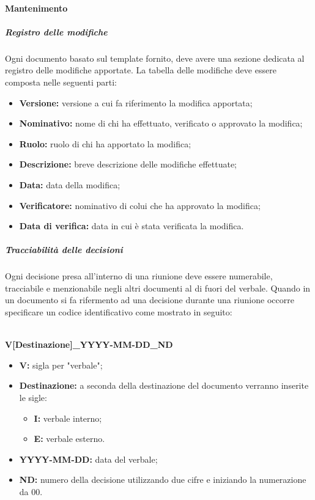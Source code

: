   \paragraph{Mantenimento}
	  \subparagraph*{Registro delle modifiche}
	  Ogni documento basato sul template fornito, deve avere una sezione dedicata al registro delle modifiche apportate.
	  La tabella delle modifiche deve essere composta nelle seguenti parti:
	  \begin{itemize}
	  	\item \textbf{Versione:} versione a cui fa riferimento la modifica apportata;
	  	\item \textbf{Nominativo:} nome di chi ha effettuato, verificato o approvato la modifica;
	  	\item \textbf{Ruolo:} ruolo di chi ha apportato la modifica;
	  	\item \textbf{Descrizione:} breve descrizione delle modifiche effettuate;
	  	\item \textbf{Data:} data della modifica;
	  	\item \textbf{Verificatore:} nominativo di colui che ha approvato la modifica;
	  	\item \textbf{Data di verifica:} data in cui è stata verificata la modifica.
	  \end{itemize}

    \subparagraph*{Tracciabilità delle decisioni}
      Ogni decisione presa all'interno di una riunione deve essere numerabile, tracciabile e menzionabile negli altri documenti al di fuori del verbale. Quando in un documento si fa rifermento ad una decisione durante una riunione
      occorre specificare un codice identificativo come mostrato in seguito:\\\\
      \centerline{\textbf{V[Destinazione]\_YYYY-MM-DD\_ND}}
      \begin{itemize}
      	\item \textbf{V:} sigla per "verbale";
      	\item \textbf{Destinazione:} a seconda della destinazione del documento verranno inserite le sigle:
      	\begin{itemize}
      		\item \textbf{I:} verbale interno;
      		\item \textbf{E:} verbale esterno.
      	\end{itemize}
      	\item \textbf{YYYY-MM-DD:} data del verbale;
      	\item \textbf{ND:} numero della decisione utilizzando due cifre e iniziando la numerazione da 00.
      \end{itemize}
